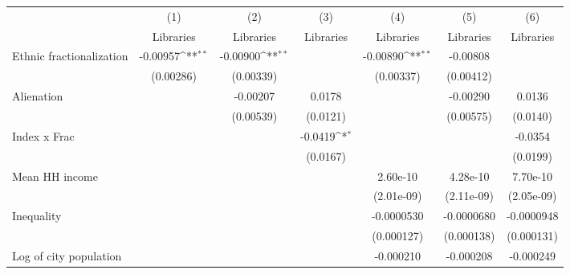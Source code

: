 {
\def\sym#1{\ifmmode^{#1}\else\(^{#1}\)\fi}
\begin{tabular}{l*{6}{c}}
\hline\hline
                    &\multicolumn{1}{c}{(1)}&\multicolumn{1}{c}{(2)}&\multicolumn{1}{c}{(3)}&\multicolumn{1}{c}{(4)}&\multicolumn{1}{c}{(5)}&\multicolumn{1}{c}{(6)}\\
                    &\multicolumn{1}{c}{Libraries}&\multicolumn{1}{c}{Libraries}&\multicolumn{1}{c}{Libraries}&\multicolumn{1}{c}{Libraries}&\multicolumn{1}{c}{Libraries}&\multicolumn{1}{c}{Libraries}\\
\hline
Ethnic fractionalization&    -0.00957\sym{**} &    -0.00900\sym{**} &                     &    -0.00890\sym{**} &    -0.00808         &                     \\
                    &   (0.00286)         &   (0.00339)         &                     &   (0.00337)         &   (0.00412)         &                     \\
[1em]
Alienation          &                     &    -0.00207         &      0.0178         &                     &    -0.00290         &      0.0136         \\
                    &                     &   (0.00539)         &    (0.0121)         &                     &   (0.00575)         &    (0.0140)         \\
[1em]
Index x Frac        &                     &                     &     -0.0419\sym{*}  &                     &                     &     -0.0354         \\
                    &                     &                     &    (0.0167)         &                     &                     &    (0.0199)         \\
[1em]
Mean HH income      &                     &                     &                     &    2.60e-10         &    4.28e-10         &    7.70e-10         \\
                    &                     &                     &                     &  (2.01e-09)         &  (2.11e-09)         &  (2.05e-09)         \\
[1em]
Inequality          &                     &                     &                     &  -0.0000530         &  -0.0000680         &  -0.0000948         \\
                    &                     &                     &                     &  (0.000127)         &  (0.000138)         &  (0.000131)         \\
[1em]
Log of city population&                     &                     &                     &   -0.000210         &   -0.000208         &   -0.000249         \\

\end{tabular}}
